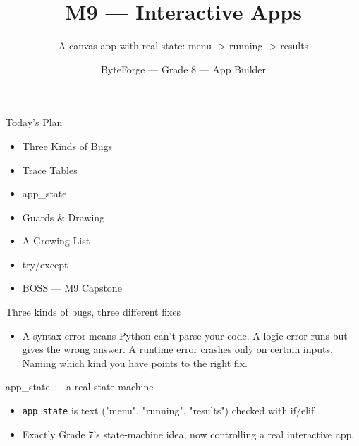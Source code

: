 \documentclass[aspectratio=169]{beamer}
\title{M9 — Interactive Apps}
\subtitle{A canvas app with real state: menu -> running -> results}
\author{ByteForge --- Grade 8 --- App Builder}
\date{}
\begin{document}
\begin{frame}
    \titlepage
\end{frame}

\begin{frame}{Today's Plan}
    \begin{itemize}
        \item Three Kinds of Bugs
        \item Trace Tables
        \item app\_state
        \item Guards \& Drawing
        \item A Growing List
        \item try/except
        \item[$\bigstar$] BOSS --- M9 Capstone
    \end{itemize}
\end{frame}

\begin{frame}{Three kinds of bugs, three different fixes}
    \large
    \begin{itemize}
        \item A syntax error means Python can't parse your code. A logic error runs but gives the wrong answer. A runtime error crashes only on certain inputs. Naming which kind you have points to the right fix.
    \end{itemize}
\end{frame}


\begin{frame}{app\_state — a real state machine}
    \large
    \begin{itemize}
        \item \texttt{app\_state} is text ("menu", "running", "results") checked with if/elif
        \item Exactly Grade 7's state-machine idea, now controlling a real interactive app.
    \end{itemize}

    \begin{center}
    \end{center}
\end{frame}
\end{document}
